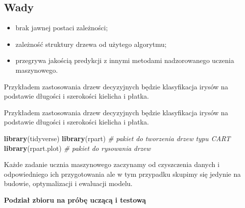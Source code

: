 \documentclass[]{book}
\newenvironment{Shaded}{\begin{snugshade}}{\end{snugshade}}
\newcommand{\CommentTok}[1]{\textcolor[rgb]{0.56,0.35,0.01}{\textit{#1}}}
\newcommand{\DataTypeTok}[1]{\textcolor[rgb]{0.13,0.29,0.53}{#1}}
\newcommand{\DecValTok}[1]{\textcolor[rgb]{0.00,0.00,0.81}{#1}}
\newcommand{\FloatTok}[1]{\textcolor[rgb]{0.00,0.00,0.81}{#1}}
\newcommand{\KeywordTok}[1]{\textcolor[rgb]{0.13,0.29,0.53}{\textbf{#1}}}
\newcommand{\NormalTok}[1]{#1}
\newcommand{\OperatorTok}[1]{\textcolor[rgb]{0.81,0.36,0.00}{\textbf{#1}}}
\newcommand{\StringTok}[1]{\textcolor[rgb]{0.31,0.60,0.02}{#1}}
\providecommand{\tightlist}{%
  \setlength{\itemsep}{0pt}\setlength{\parskip}{0pt}}
\theoremstyle{plain}
\theoremstyle{definition}
\theoremstyle{definition}
\theoremstyle{definition}
\theoremstyle{definition}
\theoremstyle{remark}
\let\BeginKnitrBlock\begin \let\EndKnitrBlock\end
\begin{document}
\hypertarget{wady}{%
\subsection{Wady}\label{wady}}

\begin{itemize}
\tightlist
\item
  brak jawnej postaci zależności;
\item
  zależność struktury drzewa od użytego algorytmu;
\item
  przegrywa jakością predykcji z innymi metodami nadzorowanego uczenia maszynowego.
\end{itemize}

\BeginKnitrBlock{example}
\protect\hypertarget{exm:przyk41}{}{\label{exm:przyk41} }Przykładem zastosowania drzew decyzyjnych będzie klasyfikacja irysów na podstawie długości i szerokości kielicha i płatka.
\EndKnitrBlock{example}

Przykładem zastosowania drzew decyzyjnych będzie klasyfikacja irysów na podstawie długości i szerokości kielicha i płatka.

\begin{Shaded}
\begin{Highlighting}[]
\KeywordTok{library}\NormalTok{(tidyverse) }
\KeywordTok{library}\NormalTok{(rpart) }\CommentTok{# pakiet do tworzenia drzew typu CART}
\KeywordTok{library}\NormalTok{(rpart.plot) }\CommentTok{# pakiet do rysowania drzew}
\end{Highlighting}
\end{Shaded}

Każde zadanie ucznia maszynowego zaczynamy od czyszczenia danych i odpowiedniego ich przygotowania ale w tym przypadku skupimy się jedynie na budowie, optymalizacji i ewaluacji modelu.

\textbf{Podział zbioru na próbę uczącą i testową}

\begin{Shaded}
\end{Shaded}
\end{document}
